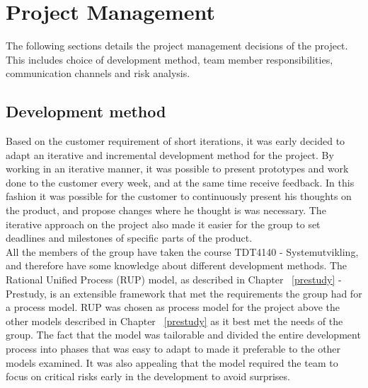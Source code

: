 \chapter{Project Management}
The following sections details the project management decisions of the project. This includes choice of development method, team member responsibilities, communication channels and risk analysis.

\section{Development method}
\label{development-method}
Based on the customer requirement of short iterations, it was early decided to adapt an iterative and incremental development method for the project. By working in an iterative manner, it was possible to present prototypes and work done to the customer every week, and at the same time receive feedback. In this fashion it was possible for the customer to continuously present his thoughts on the product, and propose changes where he thought is was necessary. The iterative approach on the project also made it easier for the group to set deadlines and milestones of specific parts of the product.\\
\newline
All the members of the group have taken the course TDT4140 - Systemutvikling, and therefore have some knowledge about different development methods. The Rational Unified Process (RUP) model, as described in Chapter ~\ref{prestudy} - Prestudy, is an extensible framework\cite{kruchten} that met the requirements the group had for a process model. RUP was chosen as process model for the project above the other models described in Chapter ~\ref{prestudy} as it best met the needs of the group. The fact that the model was tailorable and divided the entire development process into phases that was easy to adapt to made it preferable to the other models examined. It was also appealing that the model required the team to focus on critical risks early in the development to avoid surprises. 

